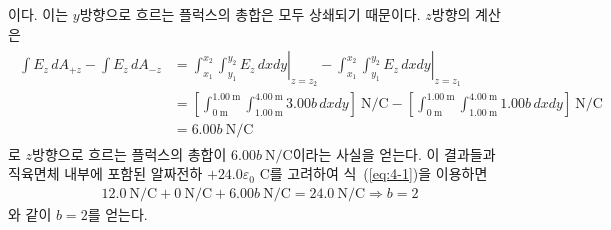 \documentclass[tightenlines,floatfix,nofootinbib,superscriptaddress,fleqn]{revtex4-2}
\begin{document}
이다. 이는 $y$방향으로 흐르는 플럭스의 총합은 모두 상쇄되기 때문이다. $z$방향의 계산은
\begin{align}
  \begin{split}
    \int E_z\,d{A_{+z}}-\int E_z\,d{A_{-z}}
    &=\left.\int^{x_2}_{x_1}\int^{y_2}_{y_1} E_z\,dxdy\right|_{z=z_2}
     -\left.\int^{x_2}_{x_1}\int^{y_2}_{y_1} E_z\,dxdy\right|_{z=z_1} \\
    &=\left[\int^{1.00~\mathrm{m}}_{0~\mathrm{m}}
    \int^{4.00~\mathrm{m}}_{1.00~\mathrm{m}} 
    3.00b\,dxdy\right]~\mathrm{N/C}
  -\left[\int^{1.00~\mathrm{m}}_{0~\mathrm{m}}
  \int^{4.00~\mathrm{m}}_{1.00~\mathrm{m}} 
  1.00b\,dxdy\right]~\mathrm{N/C} \\
  &=6.00b~\mathrm{N/C}
  \end{split}
\end{align}
로 $z$방향으로 흐르는 플럭스의 총합이 $6.00b~\mathrm{N/C}$이라는 사실을 얻는다.
이 결과들과 직육면체 내부에 포함된 알짜전하 $+24.0\varepsilon_0$ C를 고려하여 
식~(\ref{eq:4-1})을 이용하면
\begin{align}
  12.0~\mathrm{N/C} + 0~\mathrm{N/C} + 6.00b~\mathrm{N/C}
  =24.0~\mathrm{N/C}
  \Longrightarrow b=2
\end{align}
와 같이 $b=2$를 얻는다.
\vspace{0.5cm}
\end{document}
